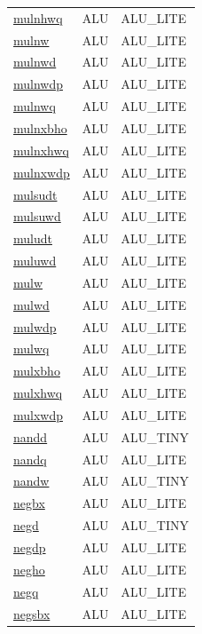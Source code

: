 \begin{small}
\begin{longtable}[l]{l l l}
\hyperlink{lvx.mulnhwq}{mulnhwq} & ALU & ALU\_LITE \\ 
\hyperlink{lvx.mulnw}{mulnw} & ALU & ALU\_LITE \\ 
\hyperlink{lvx.mulnwd}{mulnwd} & ALU & ALU\_LITE \\ 
\hyperlink{lvx.mulnwdp}{mulnwdp} & ALU & ALU\_LITE \\ 
\hyperlink{lvx.mulnwq}{mulnwq} & ALU & ALU\_LITE \\ 
\hyperlink{lvx.mulnxbho}{mulnxbho} & ALU & ALU\_LITE \\ 
\hyperlink{lvx.mulnxhwq}{mulnxhwq} & ALU & ALU\_LITE \\ 
\hyperlink{lvx.mulnxwdp}{mulnxwdp} & ALU & ALU\_LITE \\ 
\hyperlink{lvx.mulsudt}{mulsudt} & ALU & ALU\_LITE \\ 
\hyperlink{lvx.mulsuwd}{mulsuwd} & ALU & ALU\_LITE \\ 
\hyperlink{lvx.muludt}{muludt} & ALU & ALU\_LITE \\ 
\hyperlink{lvx.muluwd}{muluwd} & ALU & ALU\_LITE \\ 
\hyperlink{lvx.mulw}{mulw} & ALU & ALU\_LITE \\ 
\hyperlink{lvx.mulwd}{mulwd} & ALU & ALU\_LITE \\ 
\hyperlink{lvx.mulwdp}{mulwdp} & ALU & ALU\_LITE \\ 
\hyperlink{lvx.mulwq}{mulwq} & ALU & ALU\_LITE \\ 
\hyperlink{lvx.mulxbho}{mulxbho} & ALU & ALU\_LITE \\ 
\hyperlink{lvx.mulxhwq}{mulxhwq} & ALU & ALU\_LITE \\ 
\hyperlink{lvx.mulxwdp}{mulxwdp} & ALU & ALU\_LITE \\ 
\hyperlink{lvx.nandd}{nandd} & ALU & ALU\_TINY \\ 
\hyperlink{lvx.nandq}{nandq} & ALU & ALU\_LITE \\ 
\hyperlink{lvx.nandw}{nandw} & ALU & ALU\_TINY \\ 
\hyperlink{lvx.negbx}{negbx} & ALU & ALU\_LITE \\ 
\hyperlink{lvx.negd}{negd} & ALU & ALU\_TINY \\ 
\hyperlink{lvx.negdp}{negdp} & ALU & ALU\_LITE \\ 
\hyperlink{lvx.negho}{negho} & ALU & ALU\_LITE \\ 
\hyperlink{lvx.negq}{negq} & ALU & ALU\_LITE \\ 
\hyperlink{lvx.negsbx}{negsbx} & ALU & ALU\_LITE \\ 

\end{longtable}
\end{small}
